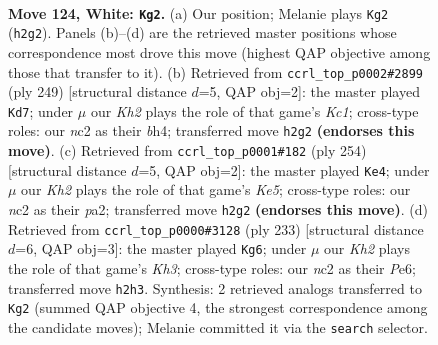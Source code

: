 \documentclass[11pt]{article}
\begin{document}
\clearpage

\begin{figure}[p]\centering
\begin{subfigure}{0.46\textwidth}\centering
\resizebox{\linewidth}{!}{%
\newchessgame
\chessboard[
  setfen={8/8/7k/6p1/8/8/2n1B2K/8 w - - 5 124},
  showmover=false,
  pgfstyle=straightmove, color=movearrow, markmove={h2-g2}
]}
\caption{}
\end{subfigure}\hfill
\begin{subfigure}{0.46\textwidth}\centering
\resizebox{\linewidth}{!}{%
\newchessgame
\chessboard[
  setfen={2k5/6P1/3P4/2K5/7B/1b6/8/8 b - - 34 125},
  showmover=false,
  pgfstyle=straightmove, color=movearrow, markmove={c8-d7}
]}
\caption{}
\end{subfigure}
\\[4pt]
\begin{subfigure}{0.46\textwidth}\centering
\resizebox{\linewidth}{!}{%
\newchessgame
\chessboard[
  setfen={8/8/8/4K3/8/8/ppk5/8 w - - 0 128},
  showmover=false,
  pgfstyle=straightmove, color=movearrow, markmove={e5-e4}
]}
\caption{}
\end{subfigure}\hfill
\begin{subfigure}{0.46\textwidth}\centering
\resizebox{\linewidth}{!}{%
\newchessgame
\chessboard[
  setfen={8/8/2b1p2k/8/5P2/6K1/8/B7 b - - 0 117},
  showmover=false,
  pgfstyle=straightmove, color=movearrow, markmove={h6-g6}
]}
\caption{}
\end{subfigure}
\caption{\textbf{Move 124, White: \texttt{Kg2}.} (a) Our position; Melanie plays \texttt{Kg2} (\texttt{h2g2}). Panels (b)--(d) are the retrieved master positions whose correspondence most drove this move (highest QAP objective among those that transfer to it). (b) Retrieved from \texttt{ccrl\_top\_p0002\#2899} (ply 249) [structural distance $d$=5, QAP obj=2]: the master played \texttt{Kd7}; under $\mu$ our \emph{Kh2} plays the role of that game's \emph{Kc1}; cross-type roles: our \emph{n}c2 as their \emph{b}h4; transferred move \texttt{h2g2} \textbf{(endorses this move)}. (c) Retrieved from \texttt{ccrl\_top\_p0001\#182} (ply 254) [structural distance $d$=5, QAP obj=2]: the master played \texttt{Ke4}; under $\mu$ our \emph{Kh2} plays the role of that game's \emph{Ke5}; cross-type roles: our \emph{n}c2 as their \emph{p}a2; transferred move \texttt{h2g2} \textbf{(endorses this move)}. (d) Retrieved from \texttt{ccrl\_top\_p0000\#3128} (ply 233) [structural distance $d$=6, QAP obj=3]: the master played \texttt{Kg6}; under $\mu$ our \emph{Kh2} plays the role of that game's \emph{Kh3}; cross-type roles: our \emph{n}c2 as their \emph{P}e6; transferred move \texttt{h2h3}. Synthesis: 2 retrieved analogs transferred to \texttt{Kg2} (summed QAP objective 4, the strongest correspondence among the candidate moves); Melanie committed it via the \texttt{search} selector.}
\label{fig:thought-m246}
\end{figure}
\end{document}

